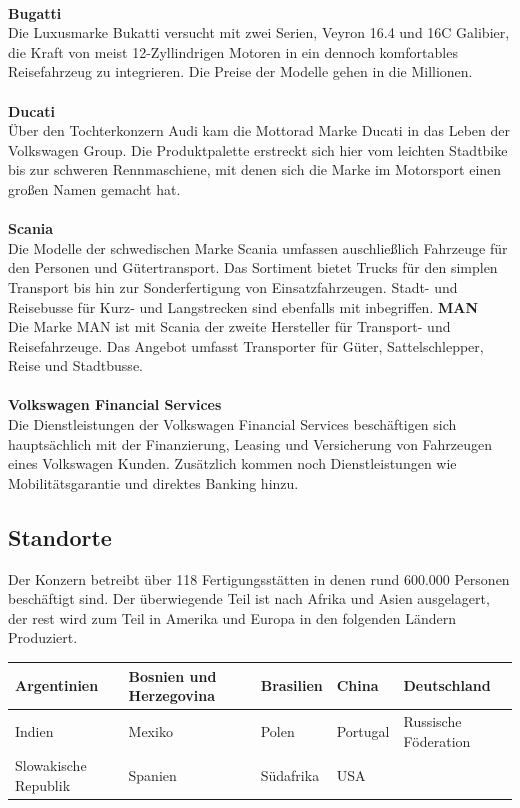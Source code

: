 \documentclass[12pt]{article}
\begin{document}
\\
\textbf{Bugatti}\\
Die Luxusmarke Bukatti versucht mit zwei Serien, Veyron 16.4 und 16C Galibier, die Kraft von meist 12-Zyllindrigen Motoren in ein dennoch komfortables Reisefahrzeug zu integrieren. Die Preise der Modelle gehen in die Millionen.\\
\\
\textbf{Ducati}\\
Über den Tochterkonzern Audi kam die Mottorad Marke Ducati in das Leben der Volkswagen Group. Die Produktpalette erstreckt sich hier vom leichten Stadtbike bis zur schweren Rennmaschiene, mit denen sich die Marke im Motorsport einen großen Namen gemacht hat.\\
\\
\textbf{Scania}\\
Die Modelle der schwedischen Marke Scania umfassen auschließlich Fahrzeuge für den Personen und Gütertransport. Das Sortiment bietet Trucks für den simplen Transport bis hin zur Sonderfertigung von Einsatzfahrzeugen. Stadt- und Reisebusse für Kurz- und Langstrecken sind ebenfalls mit inbegriffen.
\newpage
\textbf{MAN}\\
Die Marke MAN ist mit Scania der zweite Hersteller für Transport- und Reisefahrzeuge. Das Angebot umfasst Transporter für Güter, Sattelschlepper, Reise und Stadtbusse.\\
\\
\textbf{Volkswagen Financial Services}\\
Die Dienstleistungen der Volkswagen Financial Services beschäftigen sich hauptsächlich mit der Finanzierung, Leasing und Versicherung von Fahrzeugen eines Volkswagen Kunden. Zusätzlich kommen noch Dienstleistungen wie Mobilitätsgarantie und direktes Banking hinzu. \cite{vw-produkte} \cite{audiRinge} \cite{audiNeuwagen} \cite{vwPorscheUebernahme}

\subsection{Standorte}
Der Konzern betreibt über 118 Fertigungsstätten in denen rund 600.000 Personen beschäftigt sind.
Der überwiegende Teil ist nach Afrika und Asien ausgelagert, der rest wird zum Teil in Amerika und Europa in den
folgenden Ländern Produziert. \cite{produktionsstandorte}
\begin{table}[h]
	\begin{tabular}{|l|l|l|l|l|}
		\hline
		Argentinien          & Bosnien und Herzegovina & Brasilien & China    & Deutschland          \\ \hline
		Indien               & Mexiko                  & Polen     & Portugal & Russische Föderation \\ \hline
		Slowakische Republik & Spanien                 & Südafrika & USA      &                      \\ \hline
	\end{tabular}
\end{table}
\\
\end{document}
